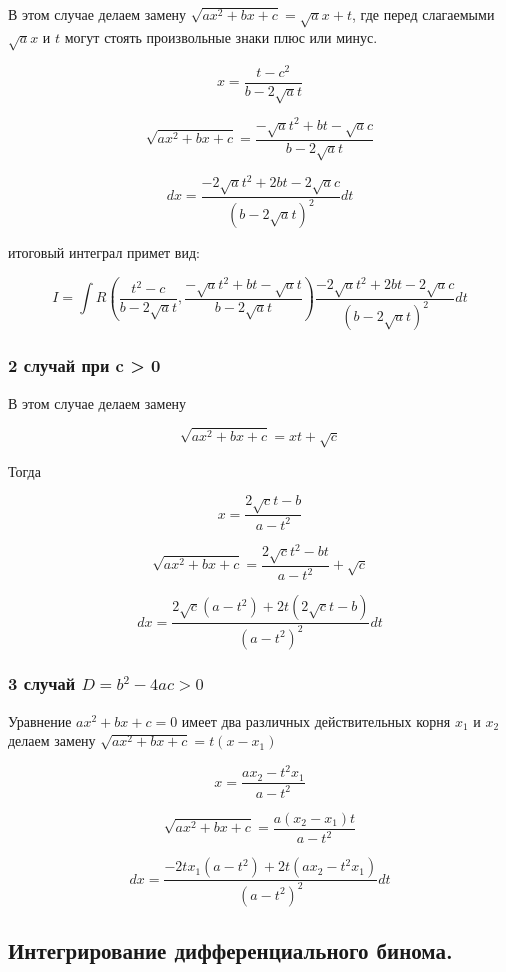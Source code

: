 \documentclass[a4paper,12pt]{article}
\theoremstyle{plain} %
\theoremstyle{definition} %
\theoremstyle{remark} %
\begin{document}
В этом случае делаем замену $\sqrt{ax^2 + bx + c} = \sqrt{a}x + t$, где перед слагаемыми $\sqrt{a}x$ и $t$ могут стоять произвольные знаки плюс или минус.

\[ x = \frac{t - c^2}{b - 2 \sqrt{a}t} \]

\[
	\sqrt{ax^2 + bx + c} = \frac{- \sqrt{a}t^2 + bt - \sqrt{a}c}{b - 2\sqrt{a}t}
\]

\[
	dx =  \frac{-2 \sqrt{a}t^2 + 2bt - 2\sqrt{a}c}{(b - 2\sqrt{a}t)^2} dt
\]

итоговый интеграл примет вид:

\[
	I = \int R \left(\frac{t^2 - c}{b - 2\sqrt{a}t}, \frac{-\sqrt{a}t^2 + bt - \sqrt{a}t}{b - 2\sqrt{a}t} \right) \frac{-2\sqrt{a}t^2 + 2bt - 2\sqrt{a}c}{(b - 2 \sqrt{a}t)^2}dt
\]

\subsubsection*{2 случай при c > 0}

В этом случае делаем замену

\[
	\sqrt{ax^2 + bx + c} = xt + \sqrt{c}
\]

Тогда

\[
	x = \frac{2\sqrt{c} t - b}{a - t^2}
\]

\[
	\sqrt{ax^2 + bx + c} = \frac{2\sqrt{c} t^2 - bt}{a - t^2} + \sqrt{c}
\]

\[
	dx = \frac{2\sqrt{c}(a - t^2) + 2t(2\sqrt{c}t - b)}{(a - t^2)^2} dt
\]

\subsubsection*{3 случай $D = b^2 - 4ac > 0$}

Уравнение $ax^2 + bx + c = 0$ имеет два различных действительных корня $x_1$ и $x_2$
делаем замену $\sqrt{ax^2 + bx + c} = t(x - x_1)$

\[
	x = \frac{ax_2 - t^2 x_1}{a - t^2}
\]

\[
	\sqrt{ax^2 + bx + c} = \frac{a(x_2 - x_1)t}{a - t^2}
\]

\[
	dx = \frac{-2tx_1(a - t^2) + 2t(ax_2 - t^2 x_1)}{(a - t^2)^2} dt
\]



\newpage
\subsection*{Интегрирование дифференциального бинома.                                                     }
\end{document}
